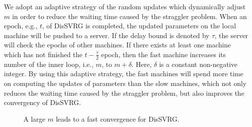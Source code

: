 \documentclass[10pt,journal,finalsubmission,compsoc]{IEEEtran}
\begin{document}
We adopt an adaptive strategy of the random updates which dynamically adjust $m$ in order to reduce the waiting time caused by the straggler problem. When an epoch, e.g., $t$, of DisSVRG is completed, the updated parameters on the local machine will be pushed to a server. If the delay bound is denoted by $\tau$, the server will check the epochs of other machines. If there exists at least one machine which has not finished the $t-\frac{\tau}{2}$ epoch, then the fast machine increases its number of the inner loop, i.e., $m$, to $m+\delta$. Here, $\delta$ is a constant non-negative integer. By using this adaptive strategy, the fast machines will spend more time on computing the updates of parameters than the slow machines, which not only reduces the waiting time caused by the straggler problem, but also improves the convergency of DisSVRG. 


\begin{figure}
\centering
{}
\caption{A large $m$ leads to a fast convergence for DisSVRG.}
\label{figure_evaluation_random_strategy}
\end{figure}
\end{document}

